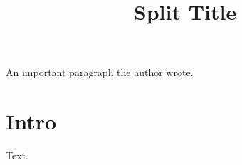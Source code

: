 \documentclass{article}
\title{Split Title}
\begin{document}
\begin{center}\end{center}
An important paragraph the author wrote.
\begin{center}\end{center}
\section{Intro}
Text.
\end{document}
